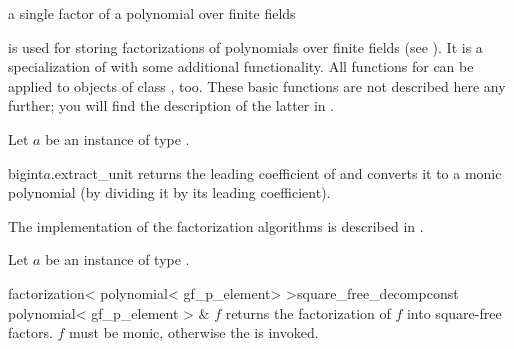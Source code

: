 

\NAME

\dotfill a single factor of a polynomial over finite fields



\ABSTRACT

 is used for storing factorizations of
polynomials over finite fields (see ).  It is a specialization of
 with some additional functionality.  All functions for
 can be applied to objects of class , too.  These basic functions are not described here any further; you will
find the description of the latter in .



\DESCRIPTION



Let $a$ be an instance of type .

\begin{fcode}{bigint}{$a$.extract_unit}{}
  returns the leading coefficient of  and converts it to a monic polynomial (by
  dividing it by its leading coefficient).
\end{fcode}



The implementation of the factorization algorithms is described in \cite{Pfahler_Thesis:1998}.

Let $a$ be an instance of type .

\begin{fcode}{factorization< polynomial< gf_p_element> >}{square_free_decomp}{const polynomial<
    gf_p_element > & $f$}%
  returns the factorization of $f$ into square-free factors.  $f$ must be monic, otherwise the
  \LEH is invoked.
\end{fcode}


